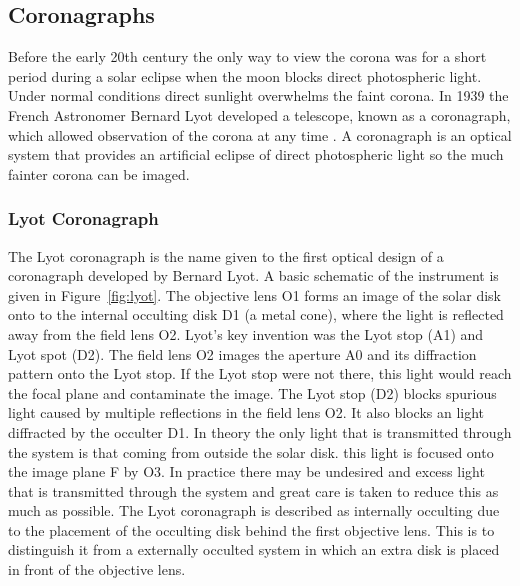 

\subsection{Coronagraphs}
Before the early 20th century the only way to view the corona was for a short period during a solar eclipse when the moon blocks direct photospheric light. Under normal conditions direct sunlight overwhelms the faint corona. In 1939 the French Astronomer Bernard Lyot developed a telescope, known as a coronagraph, which allowed observation of the corona at any time \citep{lyot1939}. A coronagraph is an optical system that provides an artificial eclipse of direct photospheric light so the much fainter corona can be imaged.

\subsubsection{Lyot Coronagraph}\label{sec:22}
The Lyot coronagraph is the name given to the first optical design of a coronagraph developed by Bernard Lyot. A basic schematic of the instrument is given in Figure~\ref{fig:lyot}. The objective lens O1 forms an image of the solar disk onto
to the internal occulting disk D1 (a metal cone), where the light is reflected away from the field lens O2. Lyot's key invention was the Lyot stop (A1) and Lyot spot (D2). The field lens O2 images the aperture A0 and its diffraction pattern onto the Lyot stop. If the Lyot stop were not there, this light would reach the focal plane and contaminate the image. The Lyot stop (D2) blocks spurious light caused by multiple reflections in the field lens O2. It also blocks an light diffracted by the occulter D1. In theory the only light that is transmitted through the system is that coming from outside the solar disk. this light is focused onto the image plane F by O3. In practice there may be undesired and excess light that is transmitted through the system and great care is taken to reduce this as much as possible. The Lyot coronagraph is described as internally occulting due to the placement of the occulting disk behind the first objective lens. This is to distinguish it from a externally occulted system in which an extra disk is placed in front of the objective lens.

